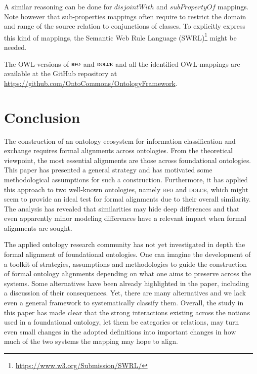 \documentclass[ao]{iosart2x}
\newcommand{\nb}[1]{\textcolor{red}{$|$}\marginpar{\hspace*{-0cm}\parbox{20mm}{\scriptsize\raggedright\textcolor{red}{#1}}}}
\newcommand{\dolce}{{\textsc{dolce}}}
\newcommand{\bfo}{{\textsc{bfo}}}
\begin{document}
A similar reasoning can be done for $\mathit{disjointWith}$ and $\mathit{subPropertyOf}$ mappings. Note however that sub-properties mappings often require to restrict the domain and range of the source relation to conjunctions of classes.  To explicitly express this kind of mappings, the Semantic Web Rule Language (SWRL)\footnote{\url{https://www.w3.org/Submission/SWRL/}} %
might be needed.%

The OWL-versions of $\bfo$ and $\dolce$ and all the identified OWL-mappings are available at the GitHub repository at \url{https://github.com/OntoCommons/OntologyFramework}.  


\section{Conclusion}\label{sect_conclusion}
The construction of an ontology ecosystem for information classification and exchange requires formal alignments across ontologies. From the theoretical viewpoint, the most essential alignments are those across foundational ontologies. This paper has presented a general strategy and has motivated some methodological assumptions for such a construction.
Furthermore, it has applied this approach to two well-known ontologies, namely {\bfo} and {\dolce}, which might seem to provide an ideal test for formal alignments due to their overall similarity. The analysis has revealed that similarities may hide deep differences and that even apparently minor modeling differences have a relevant impact when formal alignments are sought.

The applied ontology research community has not yet investigated in depth the formal alignment of foundational ontologies. One can imagine the development of a toolkit of strategies, assumptions and methodologies to guide the construction of formal ontology alignments depending on what one aims to preserve across the systems. Some alternatives have been already highlighted in the paper, including a discussion of their consequences. Yet, there are many alternatives and we lack even a general framework to systematically classify them. 
Overall, the study in this paper has made clear that the strong interactions existing across the notions used in a foundational ontology, let them be categories or relations, may turn even small changes in the adopted definitions into important changes in how much of the two systems the mapping may hope to align.
\end{document}

